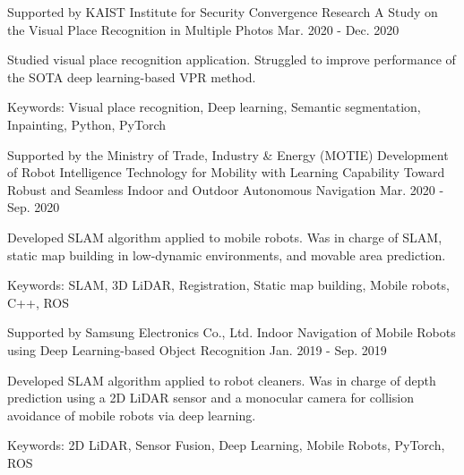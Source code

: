\begin{cventries}
  \cventry
    {Supported by KAIST Institute for Security Convergence Research} %
    {A Study on the Visual Place Recognition in Multiple Photos} %
    {\urban} %
    {Mar. 2020 - Dec. 2020} %
    {
      \begin{cvitems} %
        \item Studied visual place recognition application. Struggled to improve performance of the SOTA deep learning-based VPR method.
        \item Keywords: Visual place recognition, Deep learning, Semantic segmentation, Inpainting, Python, PyTorch
      \end{cvitems}
    }

  \cventry
    {Supported by the Ministry of Trade, Industry \& Energy (MOTIE)} %
    {Development of Robot Intelligence Technology for Mobility with Learning Capability Toward Robust and Seamless Indoor and Outdoor Autonomous Navigation} %
    {\urban} %
    {Mar. 2020 - Sep. 2020} %
    {
      \begin{cvitems} %
        \item Developed SLAM algorithm applied to mobile robots. Was in charge of SLAM, static map building in low-dynamic environments, and movable area prediction.
        \item Keywords: SLAM, 3D LiDAR, Registration, Static map building, Mobile robots, C++, ROS
      \end{cvitems}
    }

  \cventry
    {Supported by Samsung Electronics Co., Ltd.} %
    {Indoor Navigation of Mobile Robots using Deep Learning-based Object Recognition} %
    {\urban} %
    {Jan. 2019 - Sep. 2019} %
    {
      \begin{cvitems} %
        \item Developed SLAM algorithm applied to robot cleaners. Was in charge of depth prediction using a 2D LiDAR sensor and a monocular camera for collision avoidance of mobile robots via deep learning.
        \item Keywords: 2D LiDAR, Sensor Fusion, Deep Learning, Mobile Robots, PyTorch, ROS
      \end{cvitems}
    }


\end{cventries}
